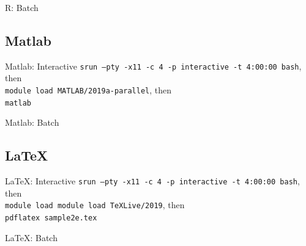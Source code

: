 \documentclass[10pt,xcolor={svgnames}]{beamer}
\begin{document}
\begin{frame}{R: Batch}

\end{frame}

\subsection{Matlab}
\begin{frame}{Matlab: Interactive}
\alert{\texttt{srun --pty -x11 -c 4 -p interactive -t 4:00:00 bash}}, then \\ 
\alert{\texttt{module load MATLAB/2019a-parallel}}, then \\
\alert{\texttt{matlab}}
\end{frame}

\begin{frame}{Matlab: Batch}

\end{frame}

\subsection{\LaTeX}
\begin{frame}{\LaTeX: Interactive}
\alert{\texttt{srun --pty -x11 -c 4 -p interactive -t 4:00:00 bash}}, then \\ 
\alert{\texttt{module load module load TeXLive/2019}}, then \\
\alert{\texttt{pdflatex sample2e.tex}}
\end{frame}

\begin{frame}{\LaTeX: Batch}

\end{frame}
\end{document}
